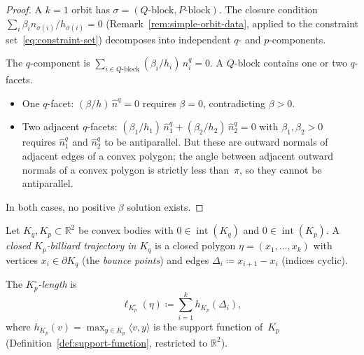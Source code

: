 \begin{proof}
A $k = 1$ orbit has $\sigma = (Q\text{-block}, P\text{-block})$.
The closure condition $\sum_i \beta_i n_{\sigma(i)} / h_{\sigma(i)} = 0$
(Remark~\ref{rem:simple-orbit-data}, applied to
the constraint set~\eqref{eq:constraint-set})
decomposes into independent $q$- and $p$-components.

The $q$-component is $\sum_{i \in Q\text{-block}}
(\beta_i / h_i)\, \hat{n}_i^q = 0$.
A $Q$-block contains one or two $q$-facets.
\begin{itemize}
\item One $q$-facet: $(\beta / h)\, \hat{n}^q = 0$ requires
  $\beta = 0$, contradicting $\beta > 0$.
\item Two adjacent $q$-facets: $(\beta_1 / h_1)\, \hat{n}_1^q
  + (\beta_2 / h_2)\, \hat{n}_2^q = 0$ with $\beta_1, \beta_2 > 0$
  requires $\hat{n}_1^q$ and $\hat{n}_2^q$ to be antiparallel.
  But these are outward normals of adjacent edges of a convex polygon;
  the angle between adjacent outward normals of a convex polygon
  is strictly less than~$\pi$, so they cannot be antiparallel.
\end{itemize}
In both cases, no positive $\beta$ solution exists.
\end{proof}

\label{subsec:bounce-bound}

\begin{definition}\label{def:billiard-trajectory}
Let $K_q, K_p \subset \mathbb{R}^2$ be convex bodies with
$0 \in \operatorname{int}(K_q)$ and $0 \in \operatorname{int}(K_p)$.
A \emph{closed $K_p$-billiard trajectory in $K_q$} is a closed
polygon $\eta = (x_1, \ldots, x_k)$ with vertices
$x_i \in \partial K_q$ (the \emph{bounce points})
and edges $\Delta_i \coloneqq x_{i+1} - x_i$ (indices cyclic).

The \emph{$K_p^\circ$-length} is
\[
  \ell_{K_p^\circ}(\eta) \coloneqq
  \sum_{i=1}^{k} h_{K_p}(\Delta_i),
\]
where $h_{K_p}(v) = \max_{y \in K_p} \langle v, y \rangle$
is the support function of~$K_p$
(Definition~\ref{def:support-function}, restricted to $\mathbb{R}^2$).
\end{definition}

